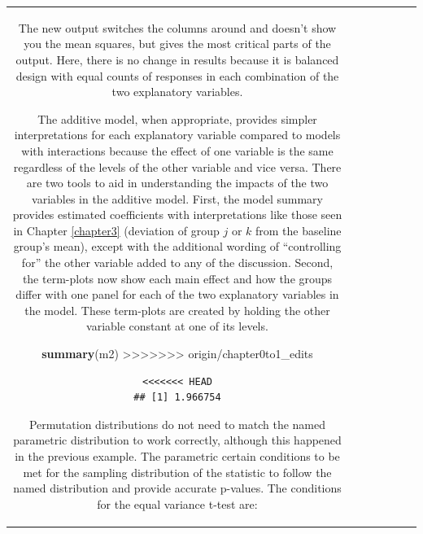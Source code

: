 \documentclass[]{book}
\newenvironment{Shaded}{\begin{snugshade}}{\end{snugshade}}
\newcommand{\KeywordTok}[1]{\textcolor[rgb]{0.13,0.29,0.53}{\textbf{#1}}}
\newcommand{\NormalTok}[1]{#1}
\theoremstyle{definition}
\theoremstyle{definition}
\theoremstyle{remark}
\begin{document}
\begin{longtable}[]{@{}ccccccc@{}}
\begin{minipage}[b]{0.10\columnwidth}
\begin{Shaded}
\begin{Highlighting}[]
\begin{Shaded}
\begin{Highlighting}[]
The new output switches the columns around and doesn't show you the mean
squares, but gives the most critical parts of the output. Here, there is
no change in results because it is balanced design with equal counts of
responses in each combination of the two explanatory variables.

The additive model, when appropriate, provides simpler interpretations
for each explanatory variable compared to models with interactions
because the effect of one variable is the same regardless of the levels
of the other variable and vice versa. There are two tools to aid in
understanding the impacts of the two variables in the additive model.
First, the model summary provides estimated coefficients with
interpretations like those seen in Chapter \ref{chapter3} (deviation of
group \(j\) or \(k\) from the baseline group's mean), except with the
additional wording of ``controlling for'' the other variable added to
any of the discussion. Second, the term-plots now show each main effect
and how the groups differ with one panel for each of the two explanatory
variables in the model. These term-plots are created by holding the
other variable constant at one of its levels.

\begin{Shaded}
\begin{Highlighting}[]
\KeywordTok{summary}\NormalTok{(m2)}
>>>>>>> origin/chapter0to1_edits
\end{Highlighting}
\end{Shaded}

\begin{verbatim}
<<<<<<< HEAD
## [1] 1.966754
\end{verbatim}

Permutation distributions do not need to match the named parametric
distribution to work correctly, although this happened in the previous
example. The parametric certain conditions to be met for the sampling
distribution of the statistic to follow the named distribution and
provide accurate p-values. The conditions for the equal variance t-test
are:

\newpage


\end{Highlighting}
\end{Shaded}
\end{Highlighting}
\end{Shaded}
\end{minipage}
\end{longtable}
\end{document}
